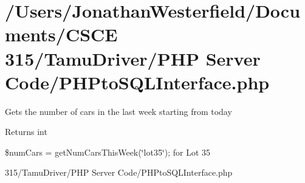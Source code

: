 \hypertarget{_2_users_2_jonathan_westerfield_2_documents_2_c_s_c_e_01315_2_tamu_driver_2_p_h_p_01_server_01_c4278c66461d45e51df78d3895915b789}{}\section{/\+Users/\+Jonathan\+Westerfield/\+Documents/\+C\+S\+C\+E 315/\+Tamu\+Driver/\+P\+H\+P Server Code/\+P\+H\+Pto\+S\+Q\+L\+Interface.\+php}
Gets the number of cars in the last week starting from today \begin{DoxyReturn}{Returns}
int
\end{DoxyReturn}
\$num\+Cars = get\+Num\+Cars\+This\+Week(\char`\"{}lot35\char`\"{}); for Lot 35


\begin{DoxyCodeInclude}
\end{DoxyCodeInclude}
 315/\+Tamu\+Driver/\+P\+HP Server Code/\+P\+H\+Pto\+S\+Q\+L\+Interface.\+php 